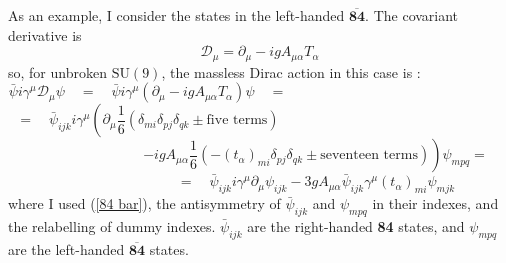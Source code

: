 \documentclass[a4paper,12pt,oneside]{article}
\begin{document}
As an example, I consider the states in the left-handed 
$\mathbf{\overline{84}}$.  The covariant derivative is \cite{Rosner}
\begin{equation}\label{covariant derivative}
\mathcal{D}_\mu = \partial_\mu - i g A_{\mu\alpha}T_\alpha
\end{equation}
so, for unbroken $\mathrm{SU}(9)$, the massless Dirac action in 
this case is \cite{Rosner}:
\begin{displaymath}
\bar{\psi}i\gamma^\mu\mathcal{D}_\mu\psi\quad = \quad
\bar{\psi}i\gamma^\mu\left(\partial_\mu
- i g A_{\mu\alpha}T_\alpha\right)\psi\quad =
\qquad\qquad\qquad\qquad\qquad\qquad\qquad\qquad
\end{displaymath}
\begin{displaymath}
=\quad\bar{\psi}_{ijk}i\gamma^\mu\left(\partial_\mu
\frac{1}{6}\left(\delta_{mi}\delta_{pj}\delta_{qk}\pm\textrm{five 
terms}\right)\right.
\qquad\qquad\qquad\qquad\qquad\qquad\qquad\qquad
\end{displaymath}
\begin{displaymath}
\qquad\qquad\qquad\qquad
\left. - i g A_{\mu\alpha}\frac{1}{6}\left(-\left(t_\alpha
\right)_{mi}\delta_{pj}\delta_{qk}\pm\textrm{seventeen 
terms}\right)\right)\psi_{mpq} =
\end{displaymath}
\begin{equation}\label{massless Dirac action}
\qquad\qquad\qquad\qquad
=\quad\bar{\psi}_{ijk}i\gamma^\mu\partial_\mu\psi_{ijk}
- 3 g A_{\mu\alpha}\bar{\psi}_{ijk}\gamma^\mu \left(t_\alpha
\right)_{mi}\psi_{mjk}
\end{equation}
where I used (\ref{84 bar}), the antisymmetry of $\bar{\psi}_{ijk}$
and $\psi_{mpq}$ in their indexes, and the relabelling of dummy 
indexes.
$\bar{\psi}_{ijk}$ are the right-handed \textbf{84} states, and
$\psi_{mpq}$ are the left-handed $\mathbf{\overline{84}}$ states.
\end{document}
